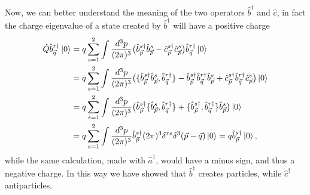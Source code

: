 Now, we can better understand the meaning of the two operators $\hat{b}^\dagger$ and $\hat{c}$, in fact the charge eigenvalue of a state created by $\hat{b}^\dagger$ will have a positive charge
\begin{align*}
    \hat{Q}\hat{b}^{r\dagger}_{\vec q}\ket{0}&=q\sum_{s=1}^{2}\int\frac{d^3p}{(2\pi)^3}\big(\hat{b}_{\vec p}^{s\dagger}\hat{b}_{\vec p}^{s}-\hat{c}_{\vec p}^{s\dagger}\hat{c}_{\vec p}^{s}\big)\hat{b}^{r\dagger}_{\vec q}\ket{0}\\&=q\sum_{s=1}^{2}\int\frac{d^3p}{(2\pi)^3}\big(\{\hat{b}_{\vec p}^{s\dagger}\hat{b}_{\vec p}^{s},\hat{b}^{r\dagger}_{\vec q}\}-\hat{b}_{\vec p}^{s\dagger}\hat{b}^{r\dagger}_{\vec q}\hat{b}_{\vec p}^{s}+\hat{c}_{\vec p}^{s\dagger}\hat{b}^{r\dagger}_{\vec q}\hat{c}_{\vec p}^{s}\big)\ket{0}\\&=q\sum_{s=1}^{2}\int\frac{d^3p}{(2\pi)^3}\big(\hat{b}_{\vec p}^{s\dagger}\{\hat{b}_{\vec p}^{s},\hat{b}^{r\dagger}_{\vec q}\}+\{\hat{b}_{\vec p}^{s\dagger},\hat{b}^{r\dagger}_{\vec q}\}\hat{b}_{\vec p}^{s}\big)\ket{0}\\&=q\sum_{s=1}^{2}\int\frac{d^3p}{(2\pi)^3}\hat{b}_{\vec p}^{s\dagger}(2\pi)^3\delta^{rs}\delta^3(\vec{ p}-\vec{ q})\ket{0}=q\hat{b}_{\vec p}^{s\dagger}\ket{0},
\end{align*}
while the same calculation, made with $\hat{a}^\dagger$, would have a minus sign, and thus a negative charge. In this way we have showed that $\hat{b}^\dagger$ creates particles, while $\hat{c}^\dagger$ antiparticles.
